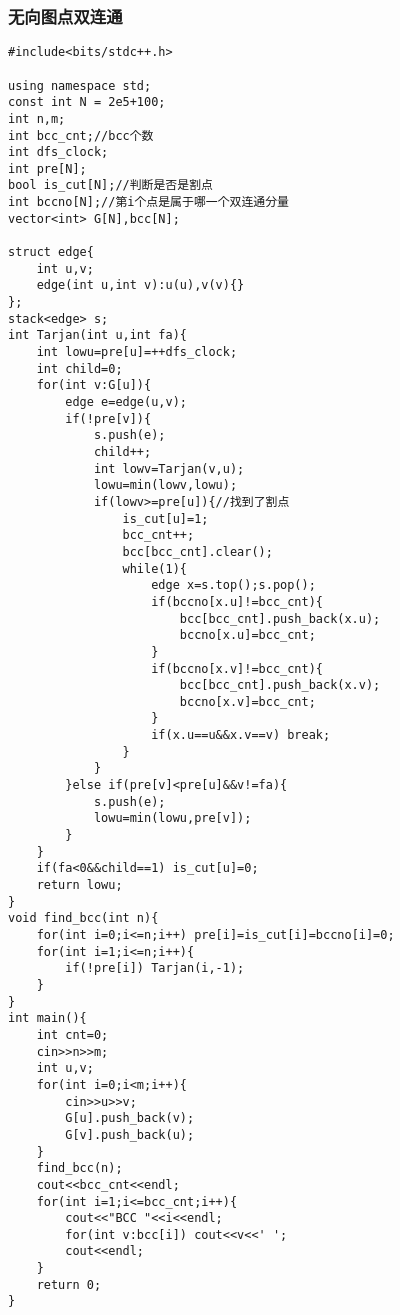 \documentclass[twocolumn,a4]{article}
\begin{document}
\subsubsection{无向图点双连通}
\begin{lstlisting}
#include<bits/stdc++.h>

using namespace std;
const int N = 2e5+100;
int n,m;
int bcc_cnt;//bcc个数
int dfs_clock;
int pre[N];
bool is_cut[N];//判断是否是割点
int bccno[N];//第i个点是属于哪一个双连通分量
vector<int> G[N],bcc[N];

struct edge{
    int u,v;
    edge(int u,int v):u(u),v(v){}
};
stack<edge> s;
int Tarjan(int u,int fa){
    int lowu=pre[u]=++dfs_clock;
    int child=0;
    for(int v:G[u]){
        edge e=edge(u,v);
        if(!pre[v]){
            s.push(e);
            child++;
            int lowv=Tarjan(v,u);
            lowu=min(lowv,lowu);
            if(lowv>=pre[u]){//找到了割点
                is_cut[u]=1;
                bcc_cnt++;
                bcc[bcc_cnt].clear();
                while(1){
                    edge x=s.top();s.pop();
                    if(bccno[x.u]!=bcc_cnt){
                        bcc[bcc_cnt].push_back(x.u);
                        bccno[x.u]=bcc_cnt;
                    }
                    if(bccno[x.v]!=bcc_cnt){
                        bcc[bcc_cnt].push_back(x.v);
                        bccno[x.v]=bcc_cnt;
                    }
                    if(x.u==u&&x.v==v) break;
                }
            }
        }else if(pre[v]<pre[u]&&v!=fa){
            s.push(e);
            lowu=min(lowu,pre[v]);
        }
    }
    if(fa<0&&child==1) is_cut[u]=0;
    return lowu;
}
void find_bcc(int n){
    for(int i=0;i<=n;i++) pre[i]=is_cut[i]=bccno[i]=0;
    for(int i=1;i<=n;i++){
        if(!pre[i]) Tarjan(i,-1);
    }
}
int main(){
    int cnt=0;
    cin>>n>>m;
    int u,v;
    for(int i=0;i<m;i++){
        cin>>u>>v;
        G[u].push_back(v);
        G[v].push_back(u);
    }
    find_bcc(n);
    cout<<bcc_cnt<<endl;
    for(int i=1;i<=bcc_cnt;i++){
        cout<<"BCC "<<i<<endl;
        for(int v:bcc[i]) cout<<v<<' ';
        cout<<endl;
    }
    return 0;
}
\end{lstlisting}
\end{document}
